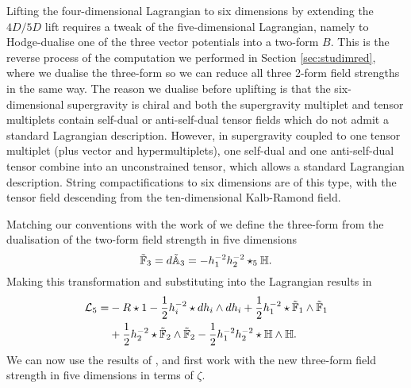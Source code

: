 Lifting the four-dimensional Lagrangian to six dimensions by extending the $4D/5D$ lift requires a tweak of the five-dimensional Lagrangian, namely to Hodge-dualise one of the three vector potentials into a two-form $B$. This is the reverse process of the computation we performed in Section \ref{sec:studimred}, where we dualise the three-form so we can reduce all three 2-form field strengths in the same way. The reason we dualise before uplifting is that the six-dimensional supergravity is chiral and both the supergravity multiplet and tensor multiplets contain self-dual or anti-self-dual tensor fields which do not admit a standard Lagrangian description. However, in supergravity coupled to one tensor multiplet (plus vector and hypermultiplets), one self-dual and one anti-self-dual tensor combine into an unconstrained tensor, which allows a standard Lagrangian description. String compactifications to six dimensions are of this type, with the tensor field descending from the ten-dimensional Kalb-Ramond field.

Matching our conventions with the work of \cite{Chow:2014cca} we define the three-form from the dualisation of the two-form field strength in five dimensions
\begin{equation}
\label{eq:hodtra}
    \tilde{\mathbb F}_3 = d\tilde{\mathbb{A}}_3 = -h_1^{-2} h_2^{-2} \star_5 \mathbb{H} .
\end{equation}
Making this transformation and substituting into the Lagrangian results in
\begin{equation}
\begin{aligned}
        \label{eq:5dchow2}
    {\cal L}_5 = &- R \star 1 - \frac{1}{2} h_i^{-2} \star dh_i \wedge dh_i +\frac{1}{2} h_1^{-2} \star \tilde{\mathbb F}_1 \wedge \tilde{\mathbb F}_1 \\
    &+ \frac{1}{2} h_2^{-2} \star \tilde{\mathbb F}_2 \wedge \tilde{\mathbb F}_2 - \frac{1}{2} h_1^{-2} h_2^{-2} \star \mathbb{H} \wedge \mathbb{H} .
\end{aligned}
\end{equation}
We can now use the results of \cite{Chow:2014cca}, and first work with the new three-form field strength in five dimensions in terms of $\zeta$.

